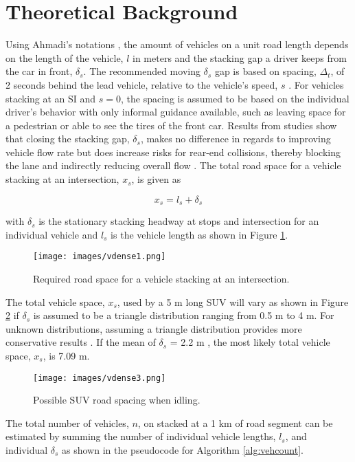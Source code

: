 \section{Theoretical Background}

Using Ahmadi's notations \citep{Ahmadi2017}, the amount of vehicles on a unit road length depends on the length of the vehicle, $l$ in meters and the stacking gap a driver keeps from the car in front, $\delta_{s}$.  The recommended moving $\delta_{s}$ gap is based on spacing, $\Delta_{t}$, of 2 seconds behind the lead vehicle, relative to the vehicle's speed, $s$ \citep{NYDMV2015, ukdot2017}.  For vehicles stacking at an SI and $s=0$, the spacing is assumed to be based on the individual driver's behavior with only informal guidance available, such as leaving space for a pedestrian or able to see the tires of the front car. Results from studies show that closing the stacking gap, $\delta_{s}$, makes no difference in regards to improving vehicle flow rate but does increase risks for rear-end collisions, thereby blocking the lane and indirectly reducing overall flow \citep{Ahmadi2017}. The total road space for a vehicle stacking at an intersection, $x_{s}$, is given as

\begin{equation}
\label{eq:roadspace}
x_{s}= l_{s} +\delta_{s}
\end{equation}

\noindent
with $\delta_{s}$ is the stationary stacking headway at stops and intersection for an individual vehicle and $l_{s}$ is the vehicle length as shown in Figure \ref{fig1:roadspace}.

\begin{figure}[H]
\centering
\texttt{[image: images/vdense1.png]} 
\caption{Required road space for a vehicle stacking at an intersection.}
\label{fig1:roadspace}
\end{figure}
%
The total vehicle space, $x_{s}$, used by a 5 m long SUV will vary as shown in Figure \ref{fig3:SUVspace} if $\delta_{s}$ is assumed to be a triangle distribution ranging from 0.5 m to 4 m. For unknown distributions, assuming a triangle distribution provides more conservative results \citep{Freeman2018}. If  the mean of $\delta_{s}$ = 2.2 m , the most likely total vehicle space, $x_{s}$,  is  7.09 m.
%
\begin{figure}[H]
\centering
\texttt{[image: images/vdense3.png]} 
\caption{Possible SUV road spacing when idling.}
\label{fig3:SUVspace}
\end{figure}
%
The total number of vehicles, $n$, on stacked at a 1 km of road segment can be estimated by summing the number of individual vehicle lengths, $l_{s}$, and individual $\delta_{s}$ as shown in the pseudocode for Algorithm \ref{alg:vehcount}.


